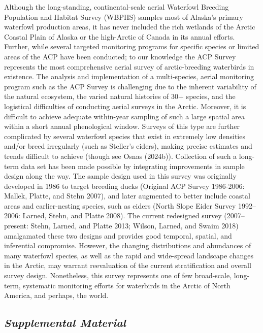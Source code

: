 \documentclass[
]{article}
\begin{document}
Although the long-standing, continental-scale aerial Waterfowl Breeding
Population and Habitat Survey (WBPHS) samples most of Alaska's primary
waterfowl production areas, it has never included the rich wetlands of
the Arctic Coastal Plain of Alaska or the high-Arctic of Canada in its
annual efforts. Further, while several targeted monitoring programs for
specific species or limited areas of the ACP have been conducted; to our
knowledge the ACP Survey represents the most comprehensive aerial survey
of arctic-breeding waterbirds in existence. The analysis and
implementation of a multi-species, aerial monitoring program such as the
ACP Survey is challenging due to the inherent variability of the natural
ecosystem, the varied natural histories of 30+ species, and the
logistical difficulties of conducting aerial surveys in the Arctic.
Moreover, it is difficult to achieve adequate within-year sampling of
such a large spatial area within a short annual phenological window.
Surveys of this type are further complicated by several waterfowl
species that exist in extremely low densities and/or breed irregularly
(such as Steller's eiders), making precise estimates and trends
difficult to achieve (though see Osnas (2024b)). Collection of such a
long-term data set has been made possible by integrating improvements in
sample design along the way. The sample design used in this survey was
originally developed in 1986 to target breeding ducks (Original ACP
Survey 1986-2006: Mallek, Platte, and Stehn 2007), and later augmented
to better include coastal areas and earlier-nesting species, such as
eiders (North Slope Eider Survey 1992--2006: Larned, Stehn, and Platte
2008). The current redesigned survey (2007--present: Stehn, Larned, and
Platte 2013; Wilson, Larned, and Swaim 2018) amalgamated these two
designs and provides good temporal, spatial, and inferential compromise.
However, the changing distributions and abundances of many waterfowl
species, as well as the rapid and wide-spread landscape changes in the
Arctic, may warrant reevaluation of the current stratification and
overall survey design. Nonetheless, this survey represents one of few
broad-scale, long-term, systematic monitoring efforts for waterbirds in
the Arctic of North America, and perhaps, the world.

\subsection*{\texorpdfstring{\emph{Supplemental
Material}}{Supplemental Material}}\label{supplemental-material}
\end{document}
